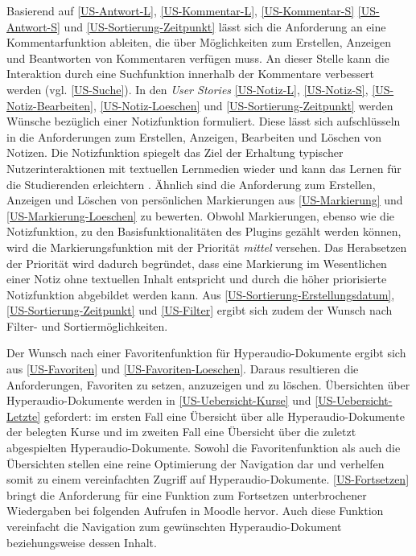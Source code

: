 Basierend auf \ref{US-Antwort-L}, \ref{US-Kommentar-L}, \ref{US-Kommentar-S} \ref{US-Antwort-S} und \ref{US-Sortierung-Zeitpunkt} lässt sich die Anforderung an eine Kommentarfunktion ableiten, die über Möglichkeiten zum Erstellen, Anzeigen und Beantworten von Kommentaren verfügen muss. An dieser Stelle kann die Interaktion durch eine Suchfunktion innerhalb der Kommentare verbessert werden (vgl. \ref{US-Suche}). In den \textit{User Stories} \ref{US-Notiz-L}, \ref{US-Notiz-S}, \ref{US-Notiz-Bearbeiten}, \ref{US-Notiz-Loeschen} und \ref{US-Sortierung-Zeitpunkt} werden Wünsche bezüglich einer Notizfunktion formuliert. Diese lässt sich aufschlüsseln in die Anforderungen zum Erstellen, Anzeigen, Bearbeiten und Löschen von Notizen. Die Notizfunktion spiegelt das Ziel der Erhaltung typischer Nutzerinteraktionen mit textuellen Lernmedien wieder und kann das Lernen für die Studierenden erleichtern \citep{scutter2010students}. Ähnlich sind die Anforderung zum Erstellen, Anzeigen und Löschen von persönlichen Markierungen aus \ref{US-Markierung} und \ref{US-Markierung-Loeschen} zu bewerten. Obwohl Markierungen, ebenso wie die Notizfunktion, zu den Basisfunktionalitäten des Plugins gezählt werden können, wird die Markierungsfunktion mit der Priorität \textit{mittel} versehen. Das Herabsetzen der Priorität wird dadurch begründet, dass eine Markierung im Wesentlichen einer Notiz ohne textuellen Inhalt entspricht und durch die höher priorisierte Notizfunktion abgebildet werden kann. Aus \ref{US-Sortierung-Erstellungsdatum}, \ref{US-Sortierung-Zeitpunkt} und \ref{US-Filter} ergibt sich zudem der Wunsch nach Filter- und Sortiermöglichkeiten. 

Der Wunsch nach einer Favoritenfunktion für Hyperaudio-Dokumente ergibt sich aus \ref{US-Favoriten} und \ref{US-Favoriten-Loeschen}. Daraus resultieren die Anforderungen, Favoriten zu setzen, anzuzeigen und zu löschen. Übersichten über Hyperaudio-Dokumente werden in \ref{US-Uebersicht-Kurse} und \ref{US-Uebersicht-Letzte} gefordert: im ersten Fall eine Übersicht über alle Hyperaudio-Dokumente der belegten Kurse und im zweiten Fall eine Übersicht über die zuletzt abgespielten Hyperaudio-Dokumente. Sowohl die Favoritenfunktion als auch die Übersichten stellen eine reine Optimierung der Navigation dar und verhelfen somit zu einem vereinfachten Zugriff auf Hyperaudio-Dokumente. \ref{US-Fortsetzen} bringt die Anforderung für eine Funktion zum Fortsetzen unterbrochener Wiedergaben bei folgenden Aufrufen in Moodle hervor. Auch diese Funktion vereinfacht die Navigation zum gewünschten Hyperaudio-Dokument beziehungsweise dessen Inhalt.

